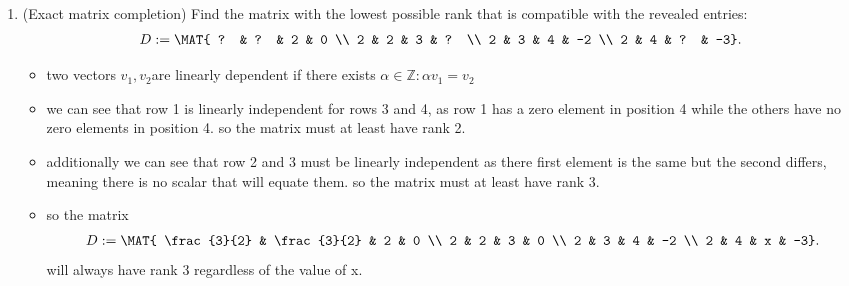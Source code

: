 \documentclass[12pt,twoside]{article}
\begin{document}
\begin{enumerate}
\newpage
\item (Exact matrix completion) Find the matrix with the lowest possible rank that is compatible with the revealed entries:
\begin{align}
D:=\MAT{ ? & ? & 2 & 0 \\ 2 & 2 & 3 & ? \\ 2 & 3 & 4 & -2 \\ 2 & 4 & ? & -3}.
\end{align}
\begin{itemize}
    \color{blue}
    \item two vectors $v_1,v_2 $are linearly dependent if there exists $\alpha \in \mathbb{Z}:\alpha v_1=v_2 $
    \item we can see that row 1 is linearly independent for rows 3 and 4, as row 1 has a zero element in position 4 while the others have no zero elements in position 4.  so the matrix must at least have rank 2.
    \item additionally we can see that row 2 and 3 must be linearly independent as there first element is the same but the second differs, meaning there is no scalar that will equate them. so the matrix must at least have rank 3. 
    \item so the matrix \begin{align}
D:=\MAT{ \frac{3}{2} & \frac{3}{2} & 2 & 0 \\ 2 & 2 & 3 & 0 \\ 2 & 3 & 4 & -2 \\ 2 & 4 & x & -3}.
\end{align}
will always have rank 3 regardless of the value of x. 
\end{itemize}



\end{enumerate}
\end{document}
